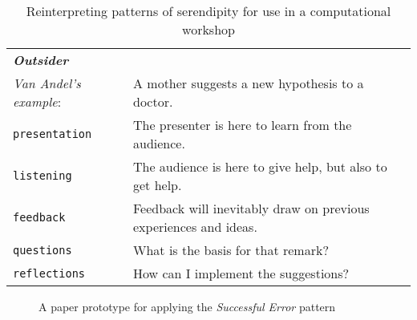 \begin{table}[p]
\begin{tabular}{lp{}}
{\bf\emph{Outsider}} & \\
\emph{Van Andel's example}: & A mother suggests a new hypothesis to a doctor. \\[.2cm]
{\tt presentation}& The presenter is here to learn from the audience. \\
{\tt listening}   & The audience is here to give help, but also to get help.\\
{\tt feedback}    & Feedback will inevitably draw on previous experiences and ideas.\\
{\tt questions}   & What is the basis for that remark?\\
{\tt reflections} & How can I implement the suggestions?\\
\end{tabular}
\vspace{.2cm}
\caption{Reinterpreting patterns of serendipity for use in a computational workshop\label{tab:reinterpret}}
\end{table}

\begin{figure}[t]
\begin{center}
\end{center}
\caption{A paper prototype for applying the \emph{Successful Error} pattern\label{fig:paper-prototype}}
\end{figure}

